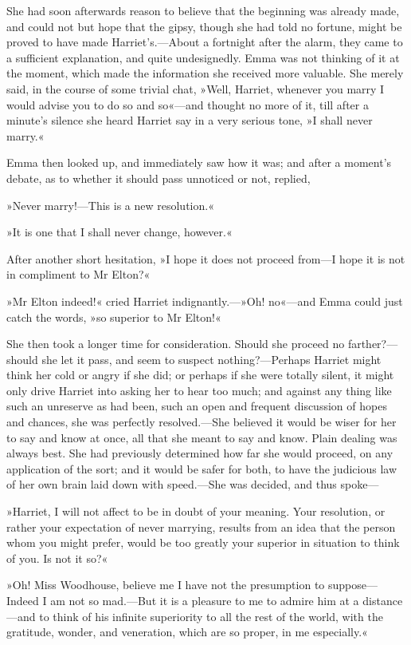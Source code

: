 She had soon afterwards reason to believe that the beginning was already made, and could not but hope that the gipsy, though she had told no fortune, might be proved to have made Harriet's.—About a fortnight after the alarm, they came to a sufficient explanation, and quite undesignedly. Emma was not thinking of it at the moment, which made the information she received more valuable. She merely said, in the course of some trivial chat, »Well, Harriet, whenever you marry I would advise you to do so and so«—and thought no more of it, till after a minute's silence she heard Harriet say in a very serious tone, »I shall never marry.«

Emma then looked up, and immediately saw how it was; and after a moment's debate, as to whether it should pass unnoticed or not, replied,

»Never marry!—This is a new resolution.«

»It is one that I shall never change, however.«

After another short hesitation, »I hope it does not proceed from—I hope it is not in compliment to Mr Elton?«

»Mr Elton indeed!« cried Harriet indignantly.—»Oh! no«—and Emma could just catch the words, »so superior to Mr Elton!«

She then took a longer time for consideration. Should she proceed no farther?—should she let it pass, and seem to suspect nothing?—Perhaps Harriet might think her cold or angry if she did; or perhaps if she were totally silent, it might only drive Harriet into asking her to hear too much; and against any thing like such an unreserve as had been, such an open and frequent discussion of hopes and chances, she was perfectly resolved.—She believed it would be wiser for her to say and know at once, all that she meant to say and know. Plain dealing was always best. She had previously determined how far she would proceed, on any application of the sort; and it would be safer for both, to have the judicious law of her own brain laid down with speed.—She was decided, and thus spoke—

»Harriet, I will not affect to be in doubt of your meaning. Your resolution, or rather your expectation of never marrying, results from an idea that the person whom you might prefer, would be too greatly your superior in situation to think of you. Is not it so?«

»Oh! Miss Woodhouse, believe me I have not the presumption to suppose— Indeed I am not so mad.—But it is a pleasure to me to admire him at a distance—and to think of his infinite superiority to all the rest of the world, with the gratitude, wonder, and veneration, which are so proper, in me especially.«

